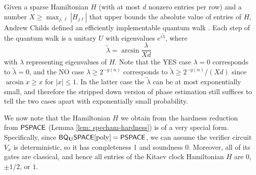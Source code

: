 \documentclass[11pt]{article}
\theoremstyle{definition}
\theoremstyle{remark}
\newcommand\PSPACE{{\sf{PSPACE}}}
\newcommand{\classfont}{\sf}
\newcommand{\Unitary}{\mathbf{U}}
\newcommand{\unitaryBQSPACE}[1]{{\classfont{BQ}_\Unitary\classfont{SPACE}}[#1]}
\DeclareMathOperator{\poly}{poly}
\begin{document}
Given a sparse Hamiltonian $H$ (with at most $d$ nonzero entries per row) and a number $X \ge \max_{j,\ell}|H_{j\ell}|$ that upper bounds the absolute value of entries of $H$, Andrew Childs defined an efficiently implementable quantum walk \cite{berry14,childs10}. Each step of the quantum walk is a unitary $U$ with eigenvalues $e^{i\tilde{\lambda}}$, where 
\begin{equation}
\tilde{\lambda} = \arcsin \frac{\lambda}{Xd}
\end{equation}
with $\lambda$ representing eigenvalues of $H$. Note that the YES case $\lambda = 0$ corresponds to $\tilde{\lambda}=0$, and the NO case $\lambda \ge 2^{-g(n)}$ corresponds to $\tilde{\lambda} \ge 2^{-g(n)}/(Xd)$ since $\arcsin x \ge x$ for $|x| \le 1$. In the latter case the $\tilde{\lambda}$ can be at most exponentially small, and therefore the stripped down version of phase estimation still suffices to tell the two cases apart with exponentially small probability.

We now note that the Hamiltonian $H$ we obtain from the hardness reduction from $\PSPACE$ (Lemma \ref{lem: specham-hardness}) is of a very special form. Specifically, since $\unitaryBQSPACE{\poly}=\PSPACE$, we can assume the verifier circuit $V_x$ is deterministic, so it has completeness 1 and soundness 0. Moreover, all of its gates are classical, and hence all entries of the Kitaev clock Hamiltonian $H$ are $0$, $\pm 1/2$, or $1$.
\end{document}
